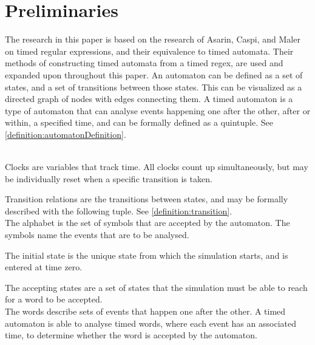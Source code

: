 \section{Preliminaries}






The research in this paper is based on the research of Asarin, Caspi, and Maler\cite{Eugene2001} on timed regular expressions, and their equivalence to timed automata. Their methods of constructing timed automata from a timed regex, are used and expanded upon throughout this paper.
An automaton can be defined as a set of states, and a set of transitions between those states. This can be visualized as a directed graph of nodes with edges connecting them.
A timed automaton is a type of automaton that can analyse events happening one after the other, after or within, a specified time, and can be formally defined as a quintuple\cite{ALUR1994}. See \cref{definition:automatonDefinition}.

\\

Clocks are variables that track time. All clocks count up simultaneously, but may be individually reset when a specific transition is taken.

Transition relations are the transitions between states, and may be formally described with the following tuple. See \cref{definition:transition}.
\\

The alphabet is the set of symbols that are accepted by the automaton. The symbols name the events that are to be analysed.

The initial state is the unique state from which the simulation starts, and is entered at time zero.

The accepting states are a set of states that the simulation must be able to reach for a word to be accepted.\\

The words describe sets of events that happen one after the other. A timed automaton is able to analyse timed words, where each event has an associated time, to determine whether the word is accepted by the automaton.
